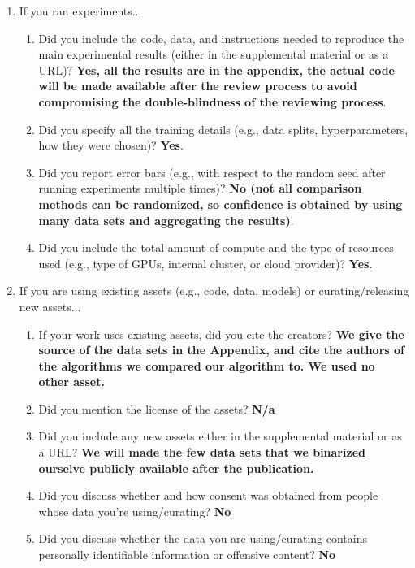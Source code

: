 \documentclass{article}
\begin{document}
\begin{enumerate}
\item If you ran experiments...
\begin{enumerate}
  \item Did you include the code, data, and instructions needed to reproduce the main experimental results (either in the supplemental material or as a URL)?
		\textbf{Yes, all the results are in the appendix, the actual code will be made available after the review process to avoid compromising the double-blindness of the reviewing process}.
  \item Did you specify all the training details (e.g., data splits, hyperparameters, how they were chosen)?
		\textbf{Yes}.
	\item Did you report error bars (e.g., with respect to the random seed after running experiments multiple times)?
    \textbf{No (not all comparison methods can be randomized, so confidence is obtained by using many data sets and aggregating the results)}.
	\item Did you include the total amount of compute and the type of resources used (e.g., type of GPUs, internal cluster, or cloud provider)?
		\textbf{Yes}.
\end{enumerate}

\item If you are using existing assets (e.g., code, data, models) or curating/releasing new assets...
\begin{enumerate}
  \item If your work uses existing assets, did you cite the creators?
    \textbf{We give the source of the data sets in the Appendix, and cite the authors of the algorithms we compared our algorithm to. We used no other asset.}
  \item Did you mention the license of the assets?
    \textbf{N/a}
  \item Did you include any new assets either in the supplemental material or as a URL?
    \textbf{We will made the few data sets that we binarized ourselve publicly available after the publication.}
  \item Did you discuss whether and how consent was obtained from people whose data you're using/curating?
    \textbf{No}
  \item Did you discuss whether the data you are using/curating contains personally identifiable information or offensive content?
    \textbf{No}
\end{enumerate}


\end{enumerate}
\end{document}
